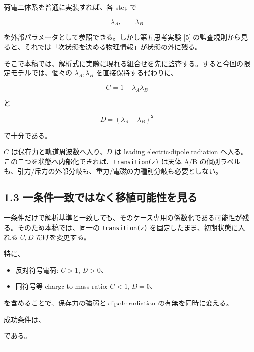 \documentclass[
  a4paper,
]{ltjsarticle}
\providecommand{\tightlist}{%
  \setlength{\itemsep}{0pt}\setlength{\parskip}{0pt}}
\begin{document}
荷電二体系を普通に実装すれば、各 step で

\[
\lambda_A,
\qquad
\lambda_B
\]

を外部パラメータとして参照できる。しかし第五思考実験 {[}5{]}
の監査規則から見ると、それでは「次状態を決める物理情報」が状態の外に残る。

そこで本稿では、解析式に実際に現れる組合せを先に監査する。すると今回の限定モデルでは、個々の
\(\lambda_A,\lambda_B\) を直接保持する代わりに、

\[
\boxed{
C=1-\lambda_A\lambda_B
}
\]

と

\[
\boxed{
D=(\lambda_A-\lambda_B)^2
}
\]

で十分である。

\(C\) は保存力と軌道周波数へ入り、\(D\) は leading electric-dipole
radiation へ入る。この二つを状態へ内部化できれば、\texttt{transition(z)}
は天体 A/B
の個別ラベルも、引力/斥力の外部分岐も、重力/電磁の力種別分岐も必要としない。

\subsection{1.3
一条件一致ではなく移植可能性を見る}\label{ux4e00ux6761ux4ef6ux4e00ux81f4ux3067ux306fux306aux304fux79fbux690dux53efux80fdux6027ux3092ux898bux308b}

一条件だけで解析基準と一致しても、そのケース専用の係数化である可能性が残る。そのため本稿では、同一の
\texttt{transition(z)} を固定したまま、初期状態に入れる \(C,D\)
だけを変更する。

特に、

\begin{itemize}
\tightlist
\item
  反対符号電荷: \(C>1\), \(D>0\)、
\item
  同符号等 charge-to-mass ratio: \(C<1\), \(D=0\)、
\end{itemize}

を含めることで、保存力の強弱と dipole radiation の有無を同時に変える。

成功条件は、

\begin{center}
\end{center}

である。

\begin{center}\rule{0.5\linewidth}{0.5pt}\end{center}
\end{document}
